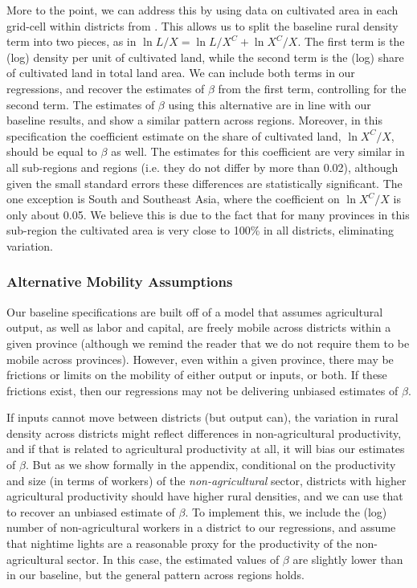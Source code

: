 \documentclass[11pt]{article}
\begin{document}
More to the point, we can address this by using data on cultivated area in each grid-cell within districts from \cite{gaez}. This allows us to split the baseline rural density term into two pieces, as in $\ln L/X = \ln L/X^C + \ln X^C/X$. The first term is the (log) density per unit of cultivated land, while the second term is the (log) share of cultivated land in total land area. We can include both terms in our regressions, and recover the estimates of $\beta$ from the first term, controlling for the second term. The estimates of $\beta$ using this alternative are in line with our baseline results, and show a similar pattern across regions. Moreover, in this specification the coefficient estimate on the share of cultivated land, $\ln X^C/X$, should be equal to $\beta$ as well. The estimates for this coefficient are very similar in all sub-regions and regions (i.e. they do not differ by more than 0.02), although given the small standard errors these differences are statistically significant. The one exception is South and Southeast Asia, where the coefficient on $\ln X^C/X$ is only about 0.05. We believe this is due to the fact that for many provinces in this sub-region the cultivated area is very close to 100\% in all districts, eliminating variation.

\subsubsection{Alternative Mobility Assumptions} 
Our baseline specifications are built off of a model that assumes agricultural output, as well as labor and capital, are freely mobile across districts within a given province (although we remind the reader that we do not require them to be mobile across provinces). However, even within a given province, there may be frictions or limits on the mobility of either output or inputs, or both. If these frictions exist, then our regressions may not be delivering unbiased estimates of $\beta$.

If inputs cannot move between districts (but output can), the variation in rural density across districts might reflect differences in non-agricultural productivity, and if that is related to agricultural productivity at all, it will bias our estimates of $\beta$. But as we show formally in the appendix, conditional on the productivity and size (in terms of workers) of the \textit{non-agricultural} sector, districts with higher agricultural productivity should have higher rural densities, and we can use that to recover an unbiased estimate of $\beta$. To implement this, we include the (log) number of non-agricultural workers in a district to our regressions, and assume that nightime lights are a reasonable proxy for the productivity of the non-agricultural sector. In this case, the estimated values of $\beta$ are slightly lower than in our baseline, but the general pattern across regions holds.
\end{document}
